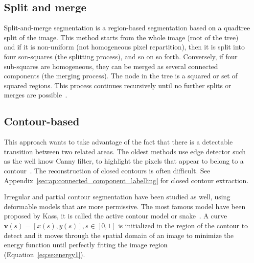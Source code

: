 
\subsection{Split and merge} %
\label{sub:split_and_merge}
Split-and-merge segmentation is a region-based segmentation based on a quadtree split of the image.
This method starts from the whole image (root of the tree) and if it is non-uniform (not homogeneous pixel repartition), then it is split into four son-squares (the splitting process), and so on so forth.
Conversely, if four sub-squares are homogeneous, they can be merged as several connected components (the merging process).
The node in the tree is a squared or set of squared regions.
This process continues recursively until no further splits or merges are possible~\cite{Kelkar2008Improved,horowitz1976picture}.


\subsection{Contour-based} %
\label{sub:ap:contour_based}
This approach wants to take advantage of the fact that there is a detectable transition between two related areas.
The oldest methods use edge detector such as the well know Canny filter, to highlight the pixels that appear to belong to a contour~\cite{canny1986computational}.
The reconstruction of closed contours is often difficult.
See Appendix~\ref{sec:ap:connected_component_labelling} for closed contour extraction.

Irregular and partial contour segmentation have been studied as well, using deformable models that are more permissive.
The most famous model have been proposed by Kass, it is called the active contour model or snake~\cite{Kass1988}.
A curve $\mathbf{v}(s)=[x(s),y(s)], s \in [0,1]$ is initialized in the region of the contour to detect and it moves through the spatial domain of an image to minimize the energy function until perfectly fitting the image region (Equation~\ref{eq:se:energy1}).

